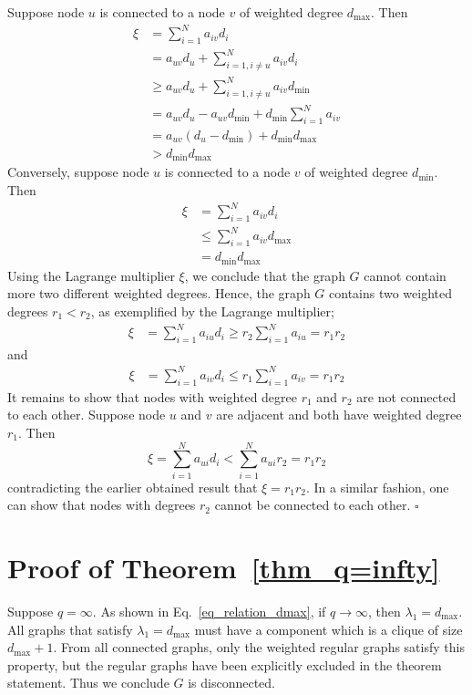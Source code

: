 \documentclass{comnet}%
\begin{document}
Suppose node $u$ is connected to a node $v$ of weighted degree $d_{\max}$. Then
\begin{align*}
	\xi &= \sum_{i=1}^N a_{iv} d_i \\
	&= a_{uv} d_u + \sum_{i=1, i \neq u}^N a_{iv} d_i \\
	&\geq a_{uv} d_u + \sum_{i=1, i \neq u}^N a_{iv} d_{\min} \\
	&= a_{uv} d_u - a_{uv} d_{\min} + d_{\min} \sum_{i=1}^N a_{iv} \\
	&= a_{uv} (d_u - d_{\min}) + d_{\min} d_{\max} \\
	&> d_{\min} d_{\max}
\end{align*}
Conversely, suppose node $u$ is connected to a node $v$ of weighted degree $d_{\min}$. Then
\begin{align*}
	\xi &= \sum_{i=1}^N a_{iv} d_i \\
	&\leq \sum_{i=1}^N a_{iv} d_{\max} \\
	&= d_{\min} d_{\max}
\end{align*}
Using the Lagrange multiplier $\xi$, we conclude that the graph $G$ cannot contain more two different weighted degrees. Hence, the graph $G$ contains two weighted degrees $r_1 < r_2$, as exemplified by the Lagrange multiplier;
\begin{align*}
	\xi &= \sum_{i=1}^N a_{iu} d_i \geq r_2 \sum_{i=1}^N a_{iu} = r_1 r_2
\end{align*}
and
\begin{align*}
	\xi &= \sum_{i=1}^N a_{iv} d_i \leq r_1 \sum_{i=1}^N a_{iv} = r_1 r_2
\end{align*}
It remains to show that nodes with weighted degree $r_1$ and $r_2$ are not connected to each other. Suppose node $u$ and $v$ are adjacent and both have weighted degree $r_1$. Then 
\begin{equation*}
	\xi = \sum_{i=1}^N a_{ui} d_i < \sum_{i=1}^N a_{ui} r_2 = r_1 r_2
\end{equation*}
contradicting the earlier obtained result that $\xi = r_1 r_2$. In a similar fashion, one can show that nodes with degrees $r_2$ cannot be connected to each other. \hfill $\square$



\section{Proof of Theorem~\ref{thm_q=infty}}\label{app_proof_qinfty}
Suppose $q=\infty$. As shown in Eq.\ \eqref{eq_relation_dmax}, if $q\to\infty$, then $\lambda_1 = d_{\max}$. All graphs that satisfy $\lambda_1 = d_{\max}$ must have a component which is a clique of size $d_{\max}+1$. From all connected graphs, only the weighted regular graphs satisfy this property, but the regular graphs have been explicitly excluded in the theorem statement. Thus we conclude $G$ is disconnected.
\end{document}
